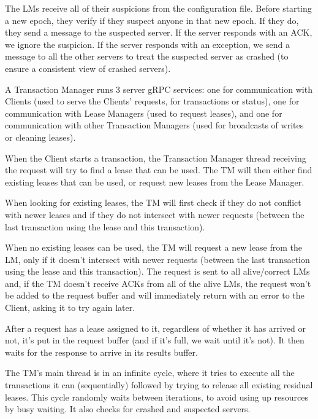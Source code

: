 \documentclass[times, 10pt,twocolumn]{article}
\begin{document}

The LMs receive all of their suspicions from the configuration file.
Before starting a new epoch, they verify if they suspect anyone in that new epoch.
If they do, they send a message to the suspected server.
If the server responds with an ACK, we ignore the suspicion.
If the server responds with an exception, we send a message to all the other servers to treat the suspected server as crashed (to ensure a consistent view of crashed servers).


A Transaction Manager runs 3 server gRPC services: one for communication with Clients (used to serve the Clients' requests, for transactions or status), one for communication with Lease Managers (used to request leases), and one for communication with other Transaction Managers (used for broadcasts of writes or cleaning leases).


When the Client starts a transaction, the Transaction Manager thread receiving the request will try to find a lease that can be used.
The TM will then either find existing leases that can be used, or request new leases from the Lease Manager.

When looking for existing leases, the TM will first check if they do not conflict with newer leases and if they do not intersect with newer requests (between the last transaction using the lease and this transaction).

When no existing leases can be used, the TM will request a new lease from the LM, only if it doesn't intersect with newer requests (between the last transaction using the lease and this transaction).
The request is sent to all alive/correct LMs and, if the TM doesn't receive ACKs from all of the alive LMs, the request won't be added to the request buffer and will immediately return with an error to the Client, asking it to try again later.

After a request has a lease assigned to it, regardless of whether it has arrived or not, it's put in the request buffer (and if it's full, we wait until it's not).
It then waits for the response to arrive in its results buffer.


The TM's main thread is in an infinite cycle, where it tries to execute all the transactions it can (sequentially) followed by trying to release all existing residual leases.
This cycle randomly waits between iterations, to avoid using up resources by busy waiting.
It also checks for crashed and suspected servers.
\end{document}
